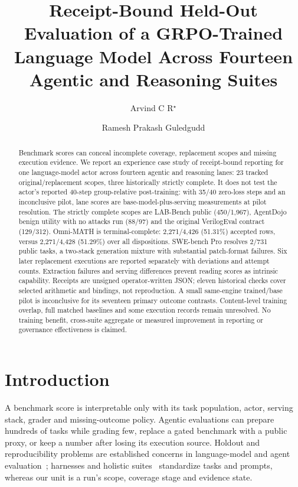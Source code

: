 \documentclass[a4paper,runningheads]{llncs}
\begin{document}
\title{Receipt-Bound Held-Out Evaluation of a GRPO-Trained Language Model Across Fourteen Agentic and Reasoning Suites}
\author{Arvind C R$^{\star}$ \and Ramesh Prakash Guledgudd}
\maketitle
\begin{abstract}
Benchmark scores can conceal incomplete coverage, replacement scopes and missing
execution evidence. We report an experience case study of receipt-bound
reporting for one language-model actor across fourteen agentic and reasoning
lanes: 23 tracked original/replacement scopes, three historically strictly
complete. It does not test the actor's reported 40-step group-relative
post-training: with 35/40 zero-loss steps and an inconclusive pilot, lane scores are
base-model-plus-serving measurements at pilot resolution. The strictly
complete scopes are LAB-Bench public (450/1,967), AgentDojo benign utility with
no attacks run (88/97) and the original VerilogEval contract (129/312).
Omni-MATH is terminal-complete: 2,271/4,426 (51.31\%) accepted rows, versus
2,271/4,428 (51.29\%) over all dispositions. SWE-bench Pro resolves 2/731
public tasks, a two-stack generation mixture with substantial patch-format
failures. Six later replacement executions are reported separately with
deviations and attempt counts. Extraction failures and serving differences
prevent reading scores as intrinsic capability. Receipts are unsigned
operator-written JSON; eleven historical checks cover selected arithmetic and
bindings, not reproduction. A small same-engine trained/base pilot is
inconclusive for its seventeen primary outcome contrasts. Content-level
training overlap, full matched baselines and some execution records remain
unresolved. No training benefit, cross-suite aggregate or measured improvement
in reporting or governance effectiveness is claimed.
\end{abstract}

\section{Introduction}
A benchmark score is interpretable only with its task population, actor,
serving stack, grader and missing-outcome policy. Agentic evaluations can
prepare hundreds of tasks while grading few, replace a gated benchmark with a
public proxy, or keep a number after losing its execution source. Holdout and
reproducibility problems are established concerns in language-model and agent
evaluation~\cite{biderman2024lessons,kapoor2024agentsmatter}; harnesses
and holistic suites~\cite{liang2023helm} standardize tasks and prompts, whereas our unit is a run's scope,
coverage stage and evidence state.
\end{document}
